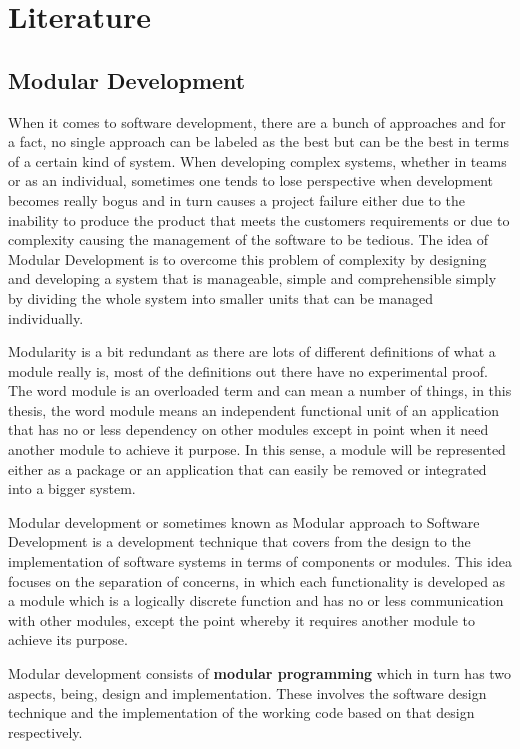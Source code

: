 \chapter{Literature}
\section{Modular Development}
When it comes to software development, there are a bunch of approaches and for a fact, no single approach can be labeled as the best but can be the best in terms of a certain kind of system. When developing complex systems, whether in teams or as an individual, sometimes one tends to lose perspective when development becomes really bogus and in turn causes a project failure either due to the inability to produce the product that meets the customers requirements or due to complexity causing the management  of the software to be tedious. The idea of Modular Development is to overcome this problem of complexity by designing and developing a system that is manageable, simple and comprehensible simply by dividing the whole system into smaller units that can be managed individually. 

Modularity is a bit redundant as there are lots of different definitions of what a module really is, most of the definitions out there have no experimental proof. The word module is an overloaded term and can mean a number of things, in this thesis, the word module means an independent functional unit of an application that has no or less dependency on other modules except in point when it need another module to achieve it purpose. In this sense, a module will be represented either as a package or an application that can easily be removed or integrated into a bigger system.

Modular development or sometimes known as Modular approach to Software Development is a development technique that covers from the design to the implementation of software systems in terms of components or modules. This idea focuses on the separation of concerns, in which each functionality is developed as a module which is a logically discrete function and has no or less communication with other modules, except the point whereby it requires another module to achieve its purpose. 

Modular development consists of {\bf modular programming} which in turn has two aspects, being, design and implementation. These involves the software design technique and the implementation of the working code based on that design respectively. 

